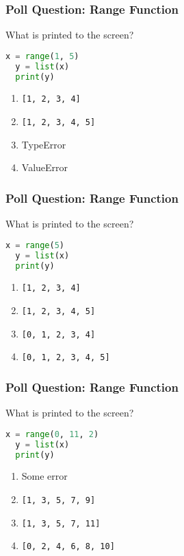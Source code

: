\documentclass{beamer}
\begin{document}
%
%
\begin{frame}[fragile]
  \frametitle{Poll Question: Range Function}
  What is printed to the screen?
  \begin{lstlisting}[language=Python, autogobble]
  x = range(1, 5)
  y = list(x)
  print(y)
  \end{lstlisting}
  \vfill
  \begin{enumerate}[A]
    \item \lstinline|[1, 2, 3, 4]|
    \item \lstinline|[1, 2, 3, 4, 5]|
    \item TypeError
    \item ValueError
  \end{enumerate}
\end{frame}

%
%
\begin{frame}[fragile]
  \frametitle{Poll Question: Range Function}
  What is printed to the screen?
  \begin{lstlisting}[language=Python, autogobble]
  x = range(5)
  y = list(x)
  print(y)
  \end{lstlisting}
  \vfill
  \begin{enumerate}[A]
    \item \lstinline|[1, 2, 3, 4]|
    \item \lstinline|[1, 2, 3, 4, 5]|
    \item \lstinline|[0, 1, 2, 3, 4]|
    \item \lstinline|[0, 1, 2, 3, 4, 5]|
  \end{enumerate}
\end{frame}

%
%
\begin{frame}[fragile]
  \frametitle{Poll Question: Range Function}
  What is printed to the screen?
  \begin{lstlisting}[language=Python, autogobble]
  x = range(0, 11, 2)
  y = list(x)
  print(y)
  \end{lstlisting}
  \vfill
  \begin{enumerate}[A]
    \item Some error
    \item \lstinline|[1, 3, 5, 7, 9]|
    \item \lstinline|[1, 3, 5, 7, 11]|
    \item \lstinline|[0, 2, 4, 6, 8, 10]|
  \end{enumerate}
\end{frame}
\end{document}
